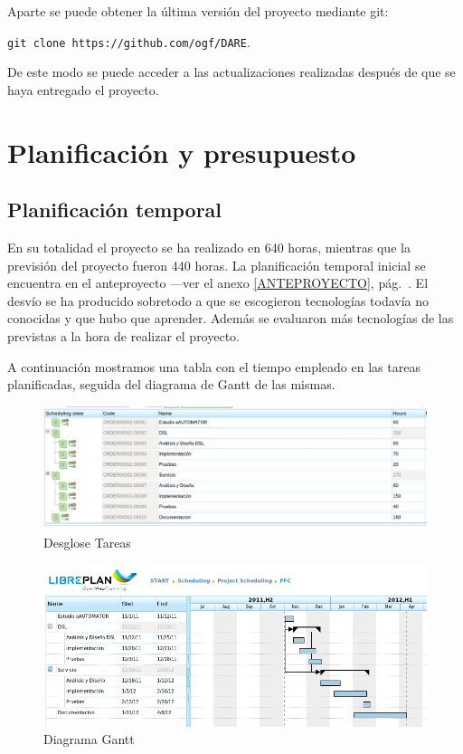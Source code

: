 Aparte se puede obtener la última versión del proyecto mediante git:

\verb+git clone https://github.com/ogf/DARE+.

De este modo se puede acceder a las actualizaciones realizadas después
de que se haya entregado el proyecto.

\section{Planificación y presupuesto}
\subsection{Planificación temporal}
En su totalidad el proyecto se ha realizado en 640 horas, mientras que
la previsión del proyecto fueron 440 horas. La planificación temporal
inicial se encuentra en el anteproyecto ---ver el anexo
\ref{ANTEPROYECTO}, pág.~\pageref{ANTEPROYECTO}. El desvío se ha
producido sobretodo a que se escogieron tecnologías todavía no
conocidas y que hubo que aprender. Además se evaluaron más tecnologías
de las previstas a la hora de realizar el proyecto.

A continuación mostramos una tabla con el tiempo empleado en las
tareas planificadas, seguida del diagrama de Gantt de las mismas.

\begin{landscape}
  \begin{figure}[hbp]
    \begin{center}
      \includegraphics[width=1.4\textwidth]{tasks-structure.png}
    \end{center}
  \caption{Desglose Tareas}\label{tasks_structure}
  \end{figure}
\end{landscape}
\begin{landscape}
  \begin{figure}[hbp]
    \begin{center}
      \includegraphics[width=1.4\textwidth]{gantt-diagram.png}
    \end{center}
  \caption{Diagrama Gantt}\label{gantt_diagram}
  \end{figure}
\end{landscape}
